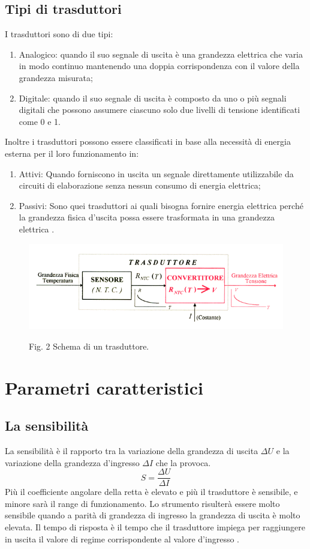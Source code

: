 \documentclass[a4paper]{report} %
\begin{document}
\subsection{Tipi di trasduttori}
I trasduttori sono di due tipi:
\begin{enumerate}
\item Analogico: quando il suo segnale di uscita è una grandezza elettrica che varia in modo continuo mantenendo una doppia corrispondenza con il valore della grandezza misurata;
\item Digitale: quando il suo segnale di uscita è composto da uno o più segnali digitali che possono assumere ciascuno solo due livelli di tensione identificati come 0 e 1.
\end{enumerate}
Inoltre i trasduttori possono essere classificati in base alla necessità di energia esterna per il loro funzionamento in:
\begin{enumerate}
\item Attivi: Quando forniscono in uscita un segnale direttamente utilizzabile da circuiti di elaborazione senza nessun consumo di energia elettrica;
\item Passivi: Sono quei trasduttori ai quali bisogna fornire energia elettrica perché la grandezza fisica d'uscita possa essere trasformata in una grandezza elettrica \cite{art:rif.11}. 
\end{enumerate}

\begin{figure}
\centering
\includegraphics[scale=.7]{Immagini/trasduttore.png}

Fig. 2 Schema di un trasduttore.
\end{figure}

\section{Parametri caratteristici}
\subsection{La sensibilità}
La sensibilità è il rapporto tra la variazione della grandezza di uscita $\Delta U$ e la variazione della grandezza d'ingresso $\Delta I$ che la provoca. 
\begin{equation}
S = \frac{\Delta U}{\Delta I}
\end{equation}
Più il coefficiente angolare della retta è elevato e più il trasduttore è sensibile, e minore sarà il range di funzionamento. Lo strumento risulterà essere molto sensibile quando a parità di grandezza di ingresso la grandezza di uscita è molto elevata.
Il tempo di risposta è il tempo che il trasduttore impiega per raggiungere in uscita il valore di regime corrispondente al valore d'ingresso \cite{art:rif.11}. 
\end{document}
